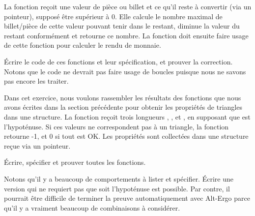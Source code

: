 

La fonction  reçoit une valeur de pièce ou
billet et ce qu'il reste à convertir (via un pointeur), supposé être
supérieur à 0. Elle calcule le nombre maximal de billet/pièce de cette
valeur pouvant tenir dans le restant, diminue la valeur du restant
conformément et retourne ce nombre. La fonction 
doit ensuite faire usage de cette fonction pour calculer le rendu de
monnaie.


Écrire le code de ces fonctions et leur spécification, et prouver la
correction. Notons que le code ne devrait pas faire usage de boucles
puisque nous ne savons pas encore les traiter.




Dans cet exercice, nous voulons rassembler les résultats des fonctions
que nous avons écrites dans la section précédente pour obtenir les
propriétés de triangles dans une structure. La fonction
 reçoit trois longueurs ,
, et , en supposant que  est
l'hypoténuse. Si ces valeurs ne correspondent pas à un triangle, la
fonction retourne -1, et 0 si tout est OK. Les propriétés sont
collectées dans une structure  reçue via un pointeur.




Écrire, spécifier et prouver toutes les fonctions.

Notons qu'il y a beaucoup de comportements à lister et spécifier.
Écrire une version qui ne requiert pas que  soit
l'hypoténuse est possible. Par contre, il pourrait être difficile
de terminer la preuve automatiquement avec Alt-Ergo parce qu'il y a
vraiment beaucoup de combinaisons à considérer.
